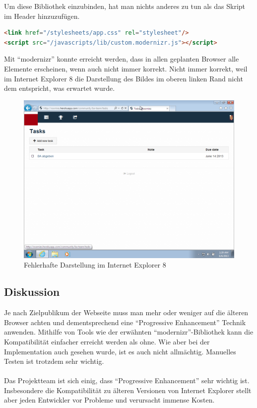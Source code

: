 Um diese Bibliothek einzubinden, hat man nichts anderes zu tun als das Skript im Header hinzuzufügen.

\begin{lstlisting}[language=HTML, caption=Einbinden von modernizr \cite{roomiesLayout}, firstnumber=11, label=lst:mdernizrLayoutServer]
<link href="/stylesheets/app.css" rel="stylesheet"/>
<script src="/javascripts/lib/custom.modernizr.js"></script>
\end{lstlisting}

Mit ``modernizr'' konnte erreicht werden, dass in allen geplanten Browser alle Elemente erscheinen, wenn auch nicht immer korrekt. Nicht immer korrekt, weil im Internet Explorer 8 die Darstellung des Bildes im oberen linken Rand nicht dem entspricht, was erwartet wurde.

\begin{figure}[H]
	\centering
	\includegraphics[width=12cm]{content/principle-demonstration/images/progressive-enhancement-ie8.png}
	\caption{Fehlerhafte Darstellung im Internet Explorer 8}
	\label{fig:iossafari-datepicker}
\end{figure}

\subsection*{Diskussion}
Je nach Zielpublikum der Webseite muss man mehr oder weniger auf die älteren Browser achten und dementsprechend eine ``Progressive Enhancement'' Technik anwenden. Mithilfe von Tools wie der erwähnten ``modernizr''-Bibliothek kann die Kompatibilität einfacher erreicht werden als ohne. Wie aber bei der Implementation auch gesehen wurde, ist es auch nicht allmächtig. Manuelles Testen ist trotzdem sehr wichtig.
\\ \\
Das Projektteam ist sich einig, dass ``Progressive Enhancement'' sehr wichtig ist. Insbesondere die Kompatibilität zu älteren Versionen von Internet Explorer stellt aber jeden Entwickler vor Probleme und verursacht immense Kosten.

